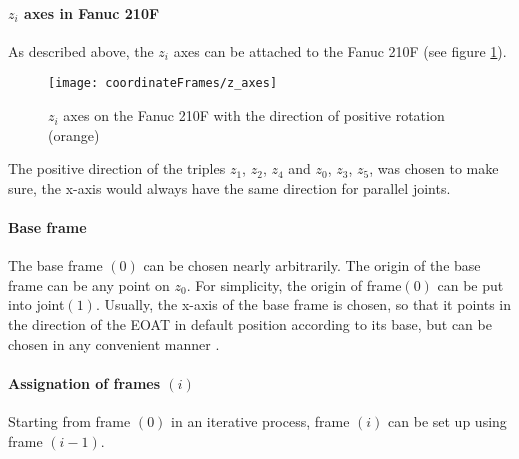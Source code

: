 \paragraph{$z_i$ axes in Fanuc 210F}
As described above, the $z_i$ axes can be attached to the Fanuc 210F (see figure \ref{fig:zi_Axes}).


\begin{figure}[H]
	\texttt{[image: coordinateFrames/z\_axes]}
	\caption{$z_i$ axes on the Fanuc 210F with the direction of positive rotation (orange)}
	\label{fig:zi_Axes}
\end{figure}

The positive direction of the triples $z_1$, $z_2$, $z_4$ and $z_0$, $z_3$, $z_5$, was chosen to make sure, the x-axis would always have the same direction for parallel joints. 

\paragraph{Base frame}

The base frame $(0)$ can be chosen nearly arbitrarily. The origin of the base frame can be any point on $z_0$. For simplicity, the origin of frame$(0)$ can be put into joint$(1)$.  Usually, the x-axis of the base frame is chosen, so that it points in the direction of the \ac{EOAT} in default position according to its base, \cite{DenavitHartenbergKonventionen} but can be chosen in any convenient manner \cite{SpongDynContr}.

\paragraph{Assignation of frames $(i)$}

Starting from frame $(0)$ in an iterative process, frame $(i)$ can be set up using frame $(i-1)$.

